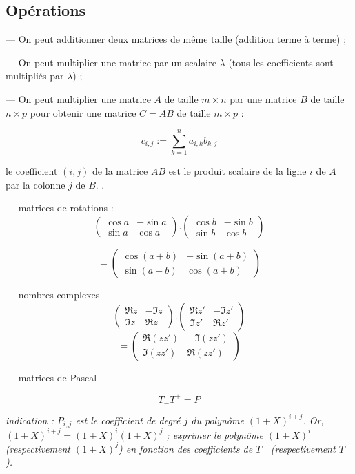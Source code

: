 \documentclass[class=report,crop=false]{standalone}
\begin{document}
\subsection{Opérations}

--- On peut additionner deux matrices de même taille (addition terme à terme) ;

--- On peut multiplier une matrice par un scalaire $\lambda$ (tous les coefficients sont multipliés par $\lambda$) ;

--- On peut multiplier une matrice $A$ de taille $m \times n$ par une matrice $B$ de taille $n \times p$ pour obtenir une matrice $C=AB$ de taille $m \times p$ :

\[c_{i,j} := \sum_{k=1}^n a_{i,k}b_{k,j}
\] 

\og le coefficient $(i,j)$ de la matrice $AB$ est le produit scalaire de la ligne $i$ de $A$ par la colonne $j$ de $B$. \fg .

\begin{exercicecours}

--- matrices de rotations : \[\left(\begin{array}{cc}
\cos a & -\sin a\\
\sin a & \cos a
\end{array}\right) . \left(\begin{array}{cc}
\cos b & -\sin b\\
\sin b & \cos b
\end{array}\right)\]

\[= \left(\begin{array}{cc}
\cos (a+b) & -\sin (a+b)\\
\sin (a+b) & \cos (a+b)
\end{array}\right) \] 

--- nombres complexes \[\left(\begin{array}{cc}
\Re z & - \Im z\\
\Im z & \Re z
\end{array}\right) . \left(\begin{array}{cc}
\Re z' & - \Im z'\\
\Im z' & \Re z'
\end{array}\right)\]
\[ = \left(\begin{array}{cc}
\Re (zz') & - \Im (zz')\\
\Im (zz') & \Re (zz')
\end{array}\right)\]

--- matrices de Pascal\label{matdeP} 

\[T_-T^+ = P\]

{\it indication : $P_{i,j}$ est le coefficient de degré $j$ du polynôme $(1+X)^{i+j}$. Or, $(1+X)^{i+j} = (1+X)^i(1+X)^j$ ; exprimer le polynôme $(1+X)^i$ (respectivement $(1+X)^j$) en fonction des coefficients de $T_-$ (respectivement $T^+$).}
\end{exercicecours}
\end{document}
